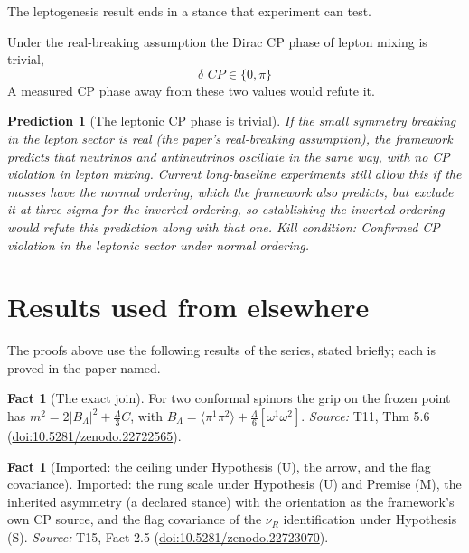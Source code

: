 \documentclass[11pt]{article}
\newtheorem{prediction}[theorem]{Prediction}
\theoremstyle{definition}
\newtheorem{fact}[theorem]{Fact}
\theoremstyle{plain}
\providecommand{\br}{}\renewcommand{\br}[1]{\langle #1\rangle}
\begin{document}
The leptogenesis result ends in a stance that experiment can test.

Under the real-breaking assumption the Dirac CP phase of lepton mixing is trivial, \[ \delta\_{CP} \in \{0, \pi\} \] A measured CP phase away from these two values would refute it.

\begin{prediction}[The leptonic CP phase is trivial]\label{c:pred.leptonic-cp-trivial}
If the small symmetry breaking in the lepton sector is real (the paper's real-breaking assumption), the framework predicts that neutrinos and antineutrinos oscillate in the same way, with no CP violation in lepton mixing. Current long-baseline experiments still allow this if the masses have the normal ordering, which the framework also predicts, but exclude it at three sigma for the inverted ordering, so establishing the inverted ordering would refute this prediction along with that one.
\emph{Kill condition:} Confirmed CP violation in the leptonic sector under normal ordering.
\end{prediction}

\section{Results used from elsewhere}
The proofs above use the following results of the series, stated briefly; each is proved in the paper named.

\begin{fact}[The exact join]\label{c:mass.exact-join}
For two conformal spinors the grip on the frozen point has $m^{2} = 2|B_{\Lambda}|^{2} + \tfrac{\Lambda}{3}C$, with $B_{\Lambda} = \br{\pi^{1}\pi^{2}} + \tfrac{\Lambda}{6}[\omega^{1}\omega^{2}]$.
\emph{Source:} T11, Thm 5.6 (\href{https://doi.org/10.5281/zenodo.22722565}{doi:10.5281/zenodo.22722565}).
\end{fact}

\begin{fact}[Imported: the ceiling under Hypothesis (U), the arrow, and the flag covariance]\label{c:neutrino.imported-ceiling-under-hypothesis-u-arrow}
Imported: the rung scale under Hypothesis (U) and Premise (M), the inherited asymmetry (a declared stance) with the orientation as the framework's own CP source, and the flag covariance of the $\nu_{R}$ identification under Hypothesis (S).
\emph{Source:} T15, Fact 2.5 (\href{https://doi.org/10.5281/zenodo.22723070}{doi:10.5281/zenodo.22723070}).
\end{fact}
\end{document}
